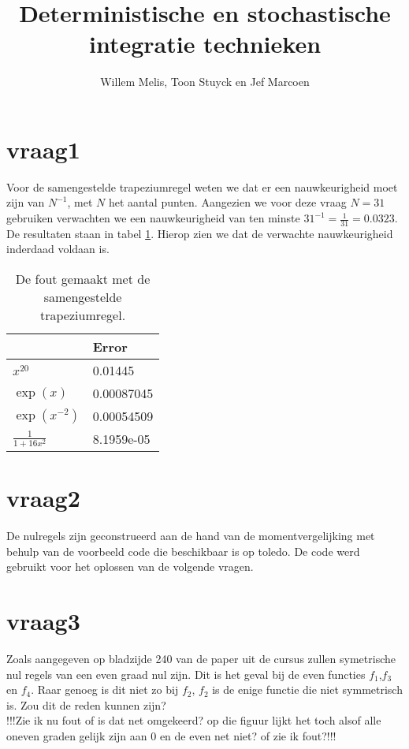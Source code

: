 \documentclass[11pt]{article} %
\title{Deterministische en stochastische integratie technieken}
\author{Willem Melis, Toon Stuyck en Jef Marcoen}
\begin{document}
\maketitle
\newpage
\newpage
\section{vraag1}
Voor de samengestelde trapeziumregel weten we dat er een nauwkeurigheid moet zijn van $N^{-1}$, met $N$ het aantal punten. Aangezien we voor deze vraag $N=31$ gebruiken verwachten we een nauwkeurigheid van ten minste $31^{-1} = \frac{1}{31}=0.0323$. De resultaten staan in tabel \ref{table:oef1}. Hierop zien we dat de verwachte nauwkeurigheid inderdaad voldaan is.

\begin{table}[H]
	\centering
	\caption{De fout gemaakt met de samengestelde trapeziumregel.}
	\label{table:oef1}
	\begin{tabular}{l|l}
		& Error      \\ \hline
		$x^{20}$              & 0.01445    \\
		$\exp{(x)}$             & 0.00087045 \\
		$\exp{(x^{-2})}$        & 0.00054509 \\
		$\frac{1}{1+16x^{2}}$ & 8.1959e-05
	\end{tabular}
\end{table}
\section{vraag2}
De nulregels zijn geconstrueerd aan de hand van de momentvergelijking met behulp van de voorbeeld code die beschikbaar is op toledo. De code werd gebruikt voor het oplossen van de volgende vragen.
\section{vraag3}

Zoals aangegeven op bladzijde 240 van de paper uit de cursus zullen symetrische nul regels van een even graad nul zijn. Dit is het geval bij de even functies $f_1$,$f_3$ en $f_4$. Raar genoeg is dit niet zo bij $f_2$, $f_2$ is de enige functie die niet symmetrisch is. Zou dit de reden kunnen zijn?\\ 

 !!!Zie ik nu fout of is dat net omgekeerd? op die figuur lijkt het toch alsof alle oneven graden gelijk zijn aan 0 en de even net niet? of zie ik fout?!!!
\end{document}
